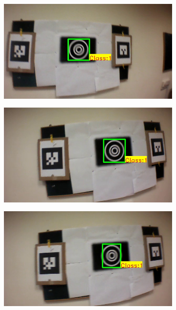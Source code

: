 \documentclass[runningheads]{llncs}
\begin{document}
\begin{figure}
\begin{subfigure}[b]{.19\textwidth}
\end{subfigure}
\begin{subfigure}[b]{.19\textwidth}
\includegraphics[width=\linewidth]{BLUT_input_01/output12.jpg}
\end{subfigure}
\begin{subfigure}[b]{.19\textwidth}
\includegraphics[width=\linewidth]{BLUT_input_01/output13.jpg}
\end{subfigure}
\begin{subfigure}[b]{.19\textwidth}
\includegraphics[width=\linewidth]{BLUT_input_01/output14.jpg}

\end{subfigure}
\end{figure}
\end{document}
